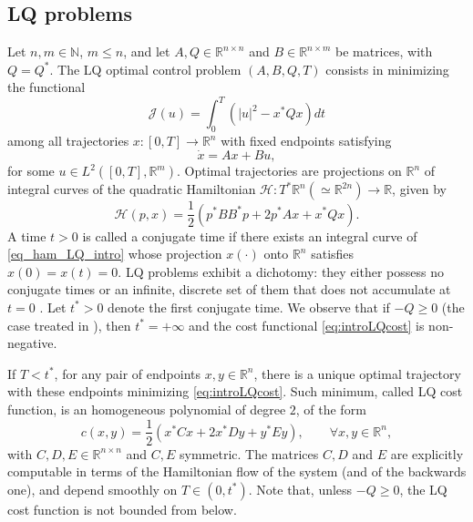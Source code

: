 \documentclass[reqno]{amsart}
\theoremstyle{plain}
\theoremstyle{definition}
\theoremstyle{remark}
\newcommand{\R}{\mathbb{R}}
\begin{document}
	\subsection{LQ problems}
	
	Let  $n,m\in \mathbb{N}$, $m\leq n$, and let $A,Q\in \mathbb{R}^{n \times n}$ and $B\in\mathbb{R}^{n \times m}$ be matrices, with $Q=Q^*$. The LQ optimal control problem $(A,B,Q,T)$ consists in minimizing the functional 
	\begin{equation}\label{eq:introLQcost}
		\mathcal{J}(u)=\int_{0}^{T}\left(|u|^2-x^*Qx\right)dt
	\end{equation}
	among all trajectories $x:[0,T]\to\mathbb{R}^n$ with fixed endpoints satisfying
	\begin{equation}
		\dot{x}=Ax+Bu,
	\end{equation}
	for some $u\in L^2([0,T],\mathbb{R}^m)$. Optimal trajectories are projections on $\mathbb{R}^n$ of integral curves of the quadratic Hamiltonian $\mathcal{H}:T^*\R^n (\simeq \mathbb{R}^{2n})\to \mathbb{R}$, given by 
	\begin{equation}\label{eq_ham_LQ_intro}
		\mathcal{H}(p,x)=\frac{1}{2}\left(p^*BB^*p+2p^*Ax+x^*Qx\right).
	\end{equation}
    A time $t>0$ is called a conjugate time if there exists an integral curve of \eqref{eq_ham_LQ_intro} whose projection $x(\cdot)$ onto $\mathbb{R}^n$ satisfies $x(0)=x(t)=0$. LQ problems exhibit a dichotomy: they either possess no conjugate times or an infinite, discrete set of them that does not accumulate at $t=0$  \cite{Agrachev_2014}. Let $t^*>0$ denote the first conjugate time. We observe that if $-Q \geq 0$ (the case treated in \cite{hinpomriff2011}), then $t^* = +\infty$ and the cost functional \eqref{eq:introLQcost} is non-negative.
    
    If $T<t^*$, for any pair of endpoints $x,y\in \R^n$, there is a unique optimal trajectory with these endpoints minimizing \eqref{eq:introLQcost}. Such minimum, called LQ cost function, is an homogeneous polynomial of degree $2$,
    of the form
	\begin{equation}
		c(x,y)=\frac{1}{2}\left(x^*Cx+2x^*Dy+y^*Ey\right),\qquad\forall x,y\in\mathbb{R}^n,
	\end{equation} 
	with $C,D,E\in\mathbb{R}^{n\times n}$ and $C,E$ symmetric. The matrices $C, D$ and $E$ are explicitly computable in terms of the Hamiltonian flow of the system (and of the backwards one), and depend smoothly on $T\in(0,t^*)$. Note that, unless $-Q\geq 0$, the LQ cost function is not bounded from below.
	
\end{document}
